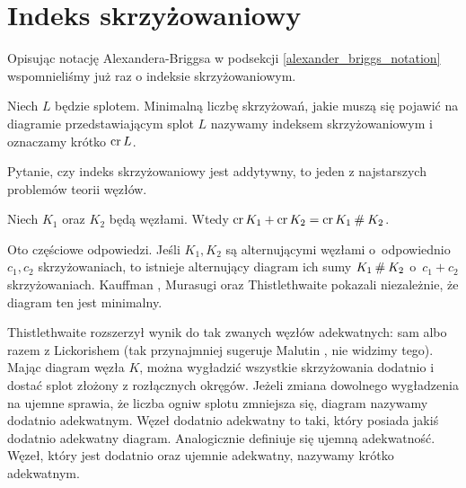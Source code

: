 
\section{Indeks skrzyżowaniowy}
Opisując notację Alexandera-Briggsa w podsekcji \ref{alexander_briggs_notation} wspomnieliśmy już raz o indeksie skrzyżowaniowym.

%
\begin{definition}
    Niech $L$ będzie splotem.
    Minimalną liczbę skrzyżowań, jakie muszą się pojawić na diagramie przedstawiającym splot $L$ nazywamy indeksem skrzyżowaniowym i oznaczamy krótko $\operatorname{cr} L$.
\end{definition}

Pytanie, czy indeks skrzyżowaniowy jest addytywny, to jeden z najstarszych problemów teorii węzłów.

\begin{conjecture}
%
%
\label{con:crossing_additive}%
    Niech $K_1$ oraz $K_2$ będą węzłami.
    Wtedy $\operatorname{cr} K_1 + \operatorname{cr} K_2 = \operatorname{cr} K_1 \mathbin{\#} K_2$.
\end{conjecture}

Oto częściowe odpowiedzi.
Jeśli $K_1, K_2$ są alternującymi węzłami o~odpowiednio $c_1, c_2$ skrzyżowaniach, to istnieje alternujący diagram ich sumy $K_1 \mathbin{\#} K_2$ o~$c_1 + c_2$ skrzyżowaniach.
%
Kauffman \cite[twierdzenie 2.10]{kauffman1987}, Murasugi \cite[wniosek 6]{murasugi1987} oraz Thistlethwaite \cite[wniosek 1]{thistlethwaite1987} pokazali niezależnie, że diagram ten jest minimalny.
%
%
%

Thistlethwaite rozszerzył wynik do tak zwanych węzłów adekwatnych: sam \cite{thistlethwaite1988} albo razem z Lickorishem \cite{lickorish1988} (tak przynajmniej sugeruje Malutin \cite[s. 3]{malyutin2016}, nie widzimy tego).
%
%
%
Mając diagram węzła $K$, można wygładzić wszystkie skrzyżowania dodatnio i dostać splot złożony z rozłącznych okręgów.
Jeżeli zmiana dowolnego wygładzenia na ujemne sprawia, że liczba ogniw splotu zmniejsza się, diagram nazywamy dodatnio adekwatnym.
Węzeł dodatnio adekwatny to taki, który posiada jakiś dodatnio adekwatny diagram.
Analogicznie definiuje się ujemną adekwatność.
Węzeł, który jest dodatnio oraz ujemnie adekwatny, nazywamy krótko adekwatnym.

